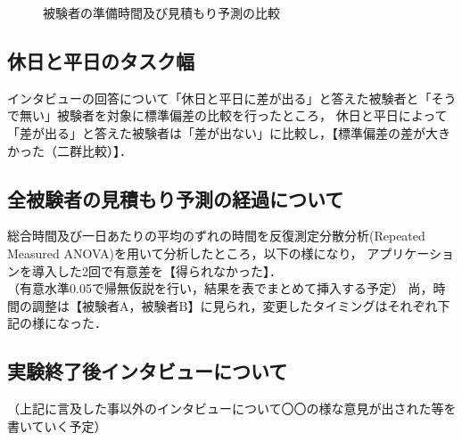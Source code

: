 \begin{figure}
\begin{center}
\caption{被験者の準備時間及び見積もり予測の比較}
\label{fig:result1}
  \end{center}
\end{figure}

\subsection{休日と平日のタスク幅}
インタビューの回答について「休日と平日に差が出る」と答えた被験者と「そうで無い」被験者を対象に標準偏差の比較を行ったところ，
休日と平日によって「差が出る」と答えた被験者は「差が出ない」に比較し，【標準偏差の差が大きかった（二群比較）】．

\subsection{全被験者の見積もり予測の経過について}
総合時間及び一日あたりの平均のずれの時間を反復測定分散分析(Repeated Measured ANOVA)を用いて分析したところ，以下の様になり，
アプリケーションを導入した2回で有意差を【得られなかった】．
\\
（有意水準0.05で帰無仮説を行い，結果を表でまとめて挿入する予定）
尚，時間の調整は【被験者A，被験者B】に見られ，変更したタイミングはそれぞれ下記の様になった．


\subsection{実験終了後インタビューについて}
（上記に言及した事以外のインタビューについて〇〇の様な意見が出された等を書いていく予定）


